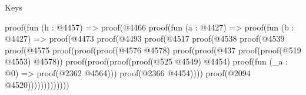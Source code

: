 \begin{lexlean}{Keys}
\begin{coremodule}
    proof(fun (h : @4457) =>
      proof(@4466
          proof(fun (a : @4427) =>
            proof(fun (b : @4427) =>
              proof(@4473
                  proof(@4493
                      proof(@4517
                          proof(@4538
                              proof(@4539
                                  proof(@4575
                                      proof(proof(proof(@4576 @4578)
                                            proof(proof(@437 proof(proof(@519 @4553) @4578))
                                                proof(proof(proof(proof(@525 @4549) @4454)
                                                      proof(fun (_a : @0) => proof(@2362 @4564)))
                                                    proof(@2366 @4454))))
                                          proof(@2094 @4520)))))))))))))
\end{coremodule}
\end{lexlean}
